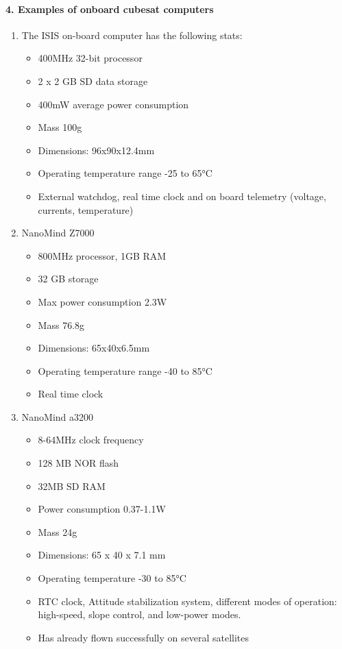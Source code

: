 \paragraph{4. Examples of onboard cubesat computers}
\begin{enumerate}
	\item The ISIS on-board computer has the following stats:
	\begin{itemize}
		\item 400MHz 32-bit processor
		\item 2 x 2 GB SD data storage
		\item 400mW average power consumption
		\item Mass 100g
		\item Dimensions: 96x90x12.4mm
		\item Operating temperature range -25 to 65°C
		\item External watchdog, real time clock and on board telemetry (voltage, currents, temperature)
	\end{itemize}
	\item NanoMind Z7000
	\begin{itemize}
		\item 800MHz processor, 1GB RAM
		\item 32 GB storage
		\item Max power consumption 2.3W
		\item Mass 76.8g
		\item Dimensions: 65x40x6.5mm
		\item Operating temperature range -40 to 85°C
		\item Real time clock
	\end{itemize}
	\item NanoMind a3200
	\begin{itemize}
		\item 8-64MHz clock frequency
		\item 128 MB NOR flash
		\item 32MB SD RAM
		\item Power consumption 0.37-1.1W
		\item Mass 24g
		\item Dimensions: 65 x 40 x 7.1 mm
		\item Operating temperature -30 to 85°C
		\item RTC clock, Attitude stabilization system, different modes of operation: high-speed, slope control, and low-power modes.
		\item Has already flown successfully on several satellites

\end{itemize}
\end{enumerate}
